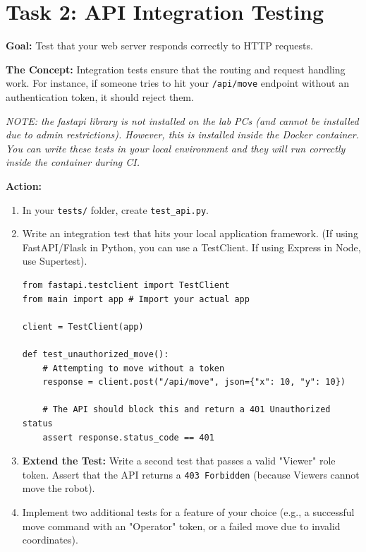 \documentclass[a4paper,12pt]{article}
\begin{document}
\section*{Task 2: API Integration Testing}

\textbf{Goal:} Test that your web server responds correctly to HTTP requests.

\textbf{The Concept:} Integration tests ensure that the routing and request handling work. For instance, if someone tries to hit your \texttt{/api/move} endpoint without an authentication token, it should reject them.

\textit{NOTE: the fastapi library is not installed on the lab PCs (and cannot be installed due to admin restrictions). However, this is installed inside the Docker container. You can write these tests in your local environment and they will run correctly inside the container during CI.}

\vspace{0.3cm}
\textbf{Action:}
\begin{enumerate}
    \item In your \texttt{tests/} folder, create \texttt{test\_api.py}.
    \item Write an integration test that hits your local application framework. (If using FastAPI/Flask in Python, you can use a TestClient. If using Express in Node, use Supertest).
    \begin{verbatim}
from fastapi.testclient import TestClient
from main import app # Import your actual app

client = TestClient(app)

def test_unauthorized_move():
    # Attempting to move without a token
    response = client.post("/api/move", json={"x": 10, "y": 10})
    
    # The API should block this and return a 401 Unauthorized status
    assert response.status_code == 401
    \end{verbatim}
    \item \textbf{Extend the Test:} Write a second test that passes a valid "Viewer" role token. Assert that the API returns a \texttt{403 Forbidden} (because Viewers cannot move the robot).
    \item Implement two additional tests for a feature of your choice (e.g., a successful move command with an "Operator" token, or a failed move due to invalid coordinates).
\end{enumerate}
\end{document}
